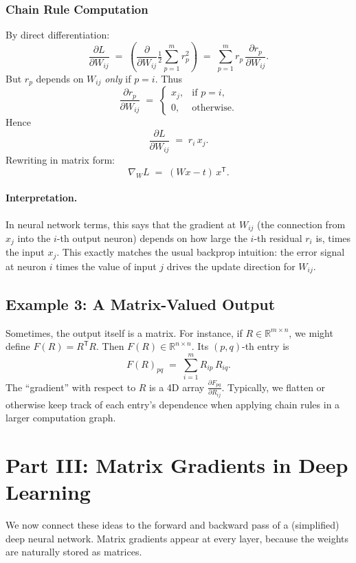 \documentclass[11pt]{article}
\newcommand{\R}{\mathbb{R}}
\begin{document}
\subsubsection{Chain Rule Computation}
By direct differentiation:
\[
\frac{\partial L}{\partial W_{ij}}
\;=\;
\left( \frac{\partial}{\partial W_{ij}} \tfrac12 \sum_{p=1}^m r_p^2 \right)
\;=\;
\sum_{p=1}^m r_p \,\frac{\partial r_p}{\partial W_{ij}}.
\]
But $r_p$ depends on $W_{ij}$ \emph{only} if $p = i$. Thus
\[
\frac{\partial r_p}{\partial W_{ij}}
\;=\;
\begin{cases}
x_j, & \text{if }p=i,\\
0,   & \text{otherwise}.
\end{cases}
\]
Hence
\[
\frac{\partial L}{\partial W_{ij}}
\;=\;
r_i \, x_j.
\]
Rewriting in matrix form:
\[
\nabla_W L 
\;=\;
(W x - t)\, x^\mathsf{T}.
\]

\paragraph{Interpretation.}
In neural network terms, 
this says that the gradient at $W_{ij}$ (the connection from $x_j$ into the $i$-th output neuron) 
depends on how large the $i$-th residual $r_i$ is, times the input $x_j$. 
This exactly matches the usual backprop intuition: 
the error signal at neuron $i$ times the value of input $j$ 
drives the update direction for $W_{ij}$.

\subsection{Example 3: A Matrix-Valued Output}
Sometimes, the output itself is a matrix. 
For instance, if $R \in \R^{m \times n}$, we might define $F(R) = R^\mathsf{T} R$. 
Then $F(R) \in \R^{n \times n}$. 
Its $(p,q)$-th entry is 
\[
F(R)_{pq} \;=\; \sum_{i=1}^m R_{i p} \, R_{i q}.
\]
The “gradient” with respect to $R$ is a 4D array 
\(\frac{\partial F_{pq}}{\partial R_{ij}}\). 
Typically, we flatten or otherwise keep track of each entry’s dependence 
when applying chain rules in a larger computation graph. 

\vspace{1cm}
\section{Part III: Matrix Gradients in Deep Learning}
\label{sec:deep-learning-context}

We now connect these ideas to the forward and backward pass of a (simplified) deep neural network. 
Matrix gradients appear at every layer, because the weights are naturally stored as matrices.
\end{document}
